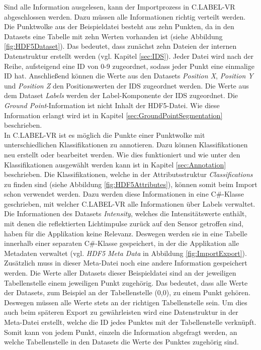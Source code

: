 Sind alle Information ausgelesen, kann der Importprozess in C.LABEL-VR abgeschlossen werden. Dazu müssen alle Informationen richtig verteilt werden. Die Punktwolke aus der Beispieldatei besteht aus zehn Punkten, da in den Datasets eine Tabelle mit zehn Werten vorhanden ist (siehe Abbildung \ref{fig:HDF5Dataset}). Das bedeutet, dass zunächst zehn Dateien der internen Datenstruktur erstellt werden (vgl. Kapitel \ref{sec:IDS}). Jeder Datei wird nach der Reihe, aufsteigend eine ID von 0-9 zugeordnet, sodass jeder Punkt eine einmalige ID hat. Anschließend können die Werte aus den Datasets \textit{Position X}, \textit{Position Y} und \textit{Position Z} den Positionswerten der IDS zugeordnet werden. Die Werte aus dem Dataset \textit{Labels} werden der Label-Komponente der IDS zugeordnet. Die \textit{Ground Point}-Information ist nicht Inhalt der HDF5-Datei. Wie diese Information erlangt wird ist in Kapitel \ref{sec:GroundPointSegmentation} beschrieben.\\

In C.LABEL-VR ist es möglich die Punkte einer Punktwolke mit unterschiedlichen Klassifikationen zu annotieren. Dazu können Klassifikationen neu erstellt oder bearbeitet werden. Wie dies funktioniert und wie unter den Klassifikationen ausgewählt werden kann ist in Kapitel \ref{sec:Annotation} beschrieben. Die Klassifikationen, welche in der Attributsstruktur \textit{Classifications} zu finden sind (siehe Abbildung \ref{fig:HDF5Attributes}), können somit beim Import schon verwendet werden. Dazu werden diese Informationen in eine C\#{}-Klasse geschrieben, mit welcher C.LABEL-VR alle Informationen über Labels verwaltet. \\

Die Informationen des Datasets \textit{Intensity}, welches die Intensitätswerte enthält, mit denen die reflektierten Lichtimpulse zurück auf den Sensor getroffen sind, haben für die Applikation keine Relevanz. Deswegen werden sie in eine Tabelle innerhalb einer separaten C\#{}-Klasse gespeichert, in der die Applikation alle Metadaten verwaltet (vgl. \textit{HDF5 Meta Data} in Abbildung \ref{fig:ImportExport}). Zusätzlich muss in dieser Meta-Datei noch eine andere Information gespeichert werden. Die Werte aller Datasets dieser Beispieldatei sind an der jeweiligen Tabellenstelle einem jeweiligen Punkt zugehörig. Das bedeutet, dass alle Werte der Datasets, zum Beispiel an der Tabellenstelle (0,0), zu einem Punkt gehören. Deswegen müssen alle Werte stets an der richtigen Tabellenstelle sein. Um dies auch beim späteren Export zu gewährleisten wird eine Datenstruktur in der Meta-Datei erstellt, welche die ID jedes Punktes mit der Tabellenstelle verknüpft. Somit kann von jedem Punkt, einzeln die Information abgefragt werden, an welche Tabellenstelle in den Datasets die Werte des Punktes zugehörig sind.\\

